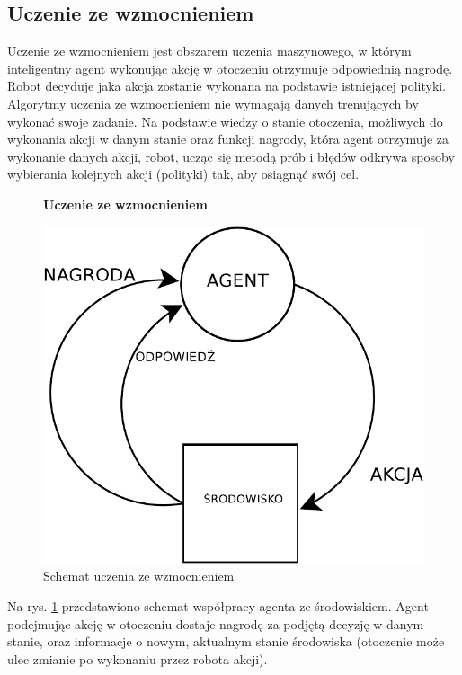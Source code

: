 \subsection{Uczenie ze wzmocnieniem}
\label{subsec:uczeniezewzmocnieniem}

Uczenie ze wzmocnieniem jest obszarem uczenia maszynowego, w którym inteligentny agent wykonując akcję w otoczeniu otrzymuje odpowiednią nagrodę.
Robot decyduje jaka akcja zostanie wykonana na podstawie istniejącej polityki. Algorytmy uczenia ze wzmocnieniem nie 
wymagają danych trenujących by wykonać swoje zadanie. Na podstawie wiedzy o stanie otoczenia, możliwych do wykonania 
akcji w danym stanie oraz funkcji nagrody, która agent otrzymuje za wykonanie danych akcji, robot, ucząc się metodą 
prób i błędów odkrywa sposoby wybierania kolejnych akcji (polityki) tak, aby osiągnąć swój cel.

\begin{figure}[h]
    \centering
    \textbf{Uczenie ze wzmocnieniem}\par\medskip
    \includegraphics[scale=0.8]{DIAGRAMreinforcementlearning}
    \caption{Schemat uczenia ze wzmocnieniem}
    \label{fig:DIAGRAMreinforcementlearning}
\end{figure}

Na rys. \ref{fig:DIAGRAMreinforcementlearning} przedstawiono schemat współpracy agenta ze środowiskiem. Agent 
podejmując akcję w otoczeniu dostaje nagrodę za podjętą decyzję w danym stanie, oraz informacje o nowym, aktualnym 
stanie środowiska (otoczenie może ulec zmianie po wykonaniu przez robota akcji).

